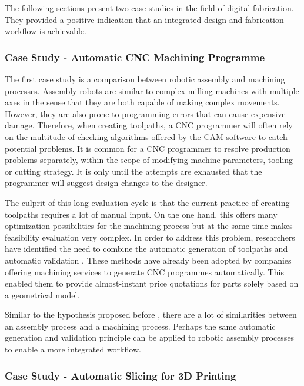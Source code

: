 The following sections present two case studies in the field of digital fabrication. They provided a positive indication that an integrated design and fabrication workflow is achievable.

\subsubsection{Case Study - Automatic CNC Machining Programme}
\label{subsubsection:introduction-case-study-automatic-cnc-machining-programme}

The first case study is a comparison between robotic assembly and machining processes. Assembly robots are similar to complex milling machines with multiple axes in the sense that they are both capable of making complex movements. However, they are also prone to programming errors that can cause expensive damage. Therefore, when creating toolpaths, a CNC programmer will often rely on the multitude of checking algorithms offered by the CAM software to catch potential problems. It is common for a CNC programmer to resolve production problems separately, within the scope of modifying machine parameters, tooling or cutting strategy. It is only until the attempts are exhausted that the programmer will suggest design changes to the designer. 

The culprit of this long evaluation cycle is that the current practice of creating toolpaths requires a lot of manual input. On the one hand, this offers many optimization possibilities for the machining process but at the same time makes feasibility evaluation very complex. In order to address this problem, researchers have identified the need to combine the automatic generation of toolpaths and automatic validation \parencite{garciaProcessPlanningBased2011,sheenMachiningFeatureRecognition2006, joshiGraphbasedHeuristicsRecognition1988}. These methods have already been adopted by companies offering machining services to generate CNC programmes automatically. This enabled them to provide almost-instant price quotations for parts solely based on a geometrical model. 

Similar to the hypothesis proposed before , there are a lot of similarities between an assembly process and a machining process. Perhaps the same automatic generation and validation principle can be applied to robotic assembly processes to enable a more integrated workflow.


\subsubsection{Case Study - Automatic Slicing for 3D Printing}
\label{subsubsection:introduction-case-study-automatic-slicing-for-3d-printing}

